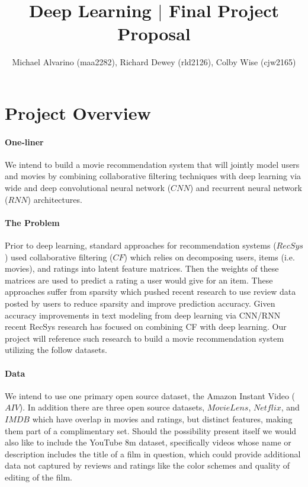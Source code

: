 \documentclass[preprint,10.5pt]{article}
\begin{document}
\title{Deep Learning $|$ Final Project Proposal}
\author{Michael Alvarino (maa2282), Richard Dewey (rld2126), Colby Wise (cjw2165)}

\maketitle

\section{Project Overview} 
\paragraph{One-liner} We intend to build a movie recommendation system that will jointly model users and movies by combining collaborative filtering techniques with deep learning via wide and deep convolutional neural network ($CNN$) and recurrent neural network ($RNN$) architectures.

\paragraph{The Problem} Prior to deep learning, standard approaches for recommendation systems ($RecSys$) used collaborative filtering ($CF$) which relies on decomposing users, items (i.e. movies), and ratings into latent feature matrices. Then the weights of these matrices are used to predict a rating a user would give for an item. These approaches suffer from sparsity which pushed recent research to use review data posted by users to reduce sparsity and improve prediction accuracy. Given accuracy improvements in text modeling from deep learning via CNN/RNN recent RecSys research has focused on combining CF with deep learning. Our project will reference such research to build a movie recommendation system utilizing the follow datasets. 

\paragraph{Data} We intend to use one primary open source dataset, the Amazon Instant Video ($AIV$). In addition there are three open source datasets, $MovieLens$, $Netflix$, and $IMDB$ which have overlap in movies and ratings, but distinct features, making them part of a complimentary set. Should the possibility present itself we would also like to include the YouTube 8m dataset, specifically videos whose name or description includes the title of a film in question, which could provide additional data not captured by reviews and ratings like the color schemes and quality of editing of the film.
\end{document}

